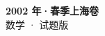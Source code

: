 \documentclass[zihao=-4, a4paper]{ctexart}
\begin{document}
\begin{center}
  {\Large\bfseries 2002 年·春季上海卷}\\[4pt]
  {\large 数学 · 试题版}
\end{center}
\medskip
{}

\end{document}
